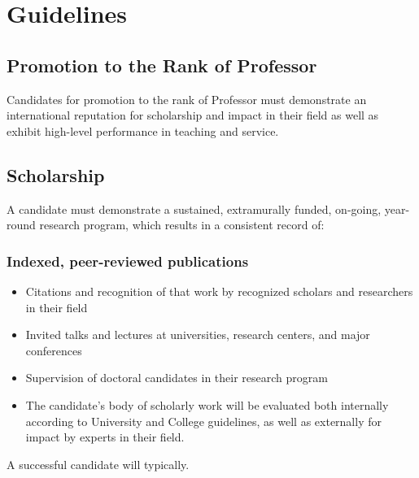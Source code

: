 

\newpage
\section*{Guidelines}
\subsection*{Promotion to the Rank of Professor }
Candidates for promotion to the rank of Professor must demonstrate an international reputation for scholarship and impact in their field as well as exhibit high-level performance in teaching and service.

\subsection*{Scholarship}
A candidate must demonstrate a sustained, extramurally funded, on-going, year-round research program, which results in a consistent record of:

\subsubsection*{Indexed, peer-reviewed publications}
\begin{itemize}
\item Citations and recognition of that work by recognized scholars and researchers in their field
\item Invited talks and lectures at universities, research centers, and major conferences
\item Supervision of doctoral candidates in their research program
\item The candidate’s body of scholarly work will be evaluated both internally according to University and College guidelines, as well as externally for impact by experts in their field.
\end{itemize}

A successful candidate will typically.

